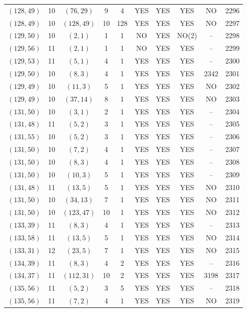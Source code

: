 \begin{longtable}{|c|c|c|c|c|c|c|c|c|c|}
$(128, 49)$ & 10 & $(76, 29)$ & 9 & 4 & YES & YES & YES & NO & 2296\\
$(128, 49)$ & 10 & $(128, 49)$ & 10 & 128 & YES & YES & YES & NO & 2297\\
$(129, 50)$ & 10 & $(2, 1)$ & 1 & 1 & NO & YES & NO(2) & -- & 2298\\
$(129, 56)$ & 11 & $(2, 1)$ & 1 & 1 & NO & YES & YES & -- & 2299\\
$(129, 53)$ & 11 & $(5, 1)$ & 4 & 1 & YES & YES & YES & -- & 2300\\
$(129, 50)$ & 10 & $(8, 3)$ & 4 & 1 & YES & YES & YES & 2342 & 2301\\
$(129, 49)$ & 10 & $(11, 3)$ & 5 & 1 & YES & YES & YES & NO & 2302\\
$(129, 49)$ & 10 & $(37, 14)$ & 8 & 1 & YES & YES & YES & NO & 2303\\
$(131, 50)$ & 10 & $(3, 1)$ & 2 & 1 & YES & YES & YES & -- & 2304\\
$(131, 48)$ & 11 & $(5, 2)$ & 3 & 1 & YES & YES & YES & -- & 2305\\
$(131, 55)$ & 10 & $(5, 2)$ & 3 & 1 & YES & YES & YES & -- & 2306\\
$(131, 50)$ & 10 & $(7, 2)$ & 4 & 1 & YES & YES & YES & -- & 2307\\
$(131, 50)$ & 10 & $(8, 3)$ & 4 & 1 & YES & YES & YES & -- & 2308\\
$(131, 50)$ & 10 & $(10, 3)$ & 5 & 1 & YES & YES & YES & -- & 2309\\
$(131, 48)$ & 11 & $(13, 5)$ & 5 & 1 & YES & YES & YES & NO & 2310\\
$(131, 50)$ & 10 & $(34, 13)$ & 7 & 1 & YES & YES & YES & NO & 2311\\
$(131, 50)$ & 10 & $(123, 47)$ & 10 & 1 & YES & YES & YES & NO & 2312\\
$(133, 39)$ & 11 & $(8, 3)$ & 4 & 1 & YES & YES & YES & -- & 2313\\
$(133, 58)$ & 11 & $(13, 5)$ & 5 & 1 & YES & YES & YES & NO & 2314\\
$(133, 31)$ & 12 & $(23, 5)$ & 7 & 1 & YES & YES & YES & NO & 2315\\
$(134, 39)$ & 11 & $(8, 3)$ & 4 & 2 & YES & YES & YES & -- & 2316\\
$(134, 37)$ & 11 & $(112, 31)$ & 10 & 2 & YES & YES & YES & 3198 & 2317\\
$(135, 56)$ & 11 & $(5, 2)$ & 3 & 5 & YES & YES & YES & -- & 2318\\
$(135, 56)$ & 11 & $(7, 2)$ & 4 & 1 & YES & YES & YES & NO & 2319\\

\end{longtable}
